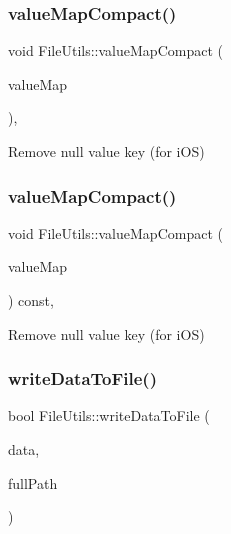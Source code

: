 \subsubsection{\texorpdfstring{value\+Map\+Compact()}{valueMapCompact()}\hspace{0.1cm}{\footnotesize\ttfamily [1/2]}}
{\footnotesize\ttfamily void File\+Utils\+::value\+Map\+Compact (\begin{DoxyParamCaption}\item[{Value\+Map \&}]{value\+Map }\end{DoxyParamCaption})\hspace{0.3cm}{\ttfamily [protected]}, {\ttfamily [virtual]}}

Remove null value key (for i\+OS) \mbox{\label{classFileUtils_a5f6e7cc4108d8987fc652e99eb858d4c}} 
\subsubsection{\texorpdfstring{value\+Map\+Compact()}{valueMapCompact()}\hspace{0.1cm}{\footnotesize\ttfamily [2/2]}}
{\footnotesize\ttfamily void File\+Utils\+::value\+Map\+Compact (\begin{DoxyParamCaption}\item[{Value\+Map \&}]{value\+Map }\end{DoxyParamCaption}) const\hspace{0.3cm}{\ttfamily [protected]}, {\ttfamily [virtual]}}

Remove null value key (for i\+OS) \mbox{\label{classFileUtils_a448ef43bd4c31852611018c951dd6eda}} 
\subsubsection{\texorpdfstring{write\+Data\+To\+File()}{writeDataToFile()}\hspace{0.1cm}{\footnotesize\ttfamily [1/3]}}
{\footnotesize\ttfamily bool File\+Utils\+::write\+Data\+To\+File (\begin{DoxyParamCaption}\item[{const \hyperlink{classData}{Data} \&}]{data,  }\item[{const std\+::string \&}]{full\+Path }\end{DoxyParamCaption})\hspace{0.3cm}{\ttfamily [virtual]}}

